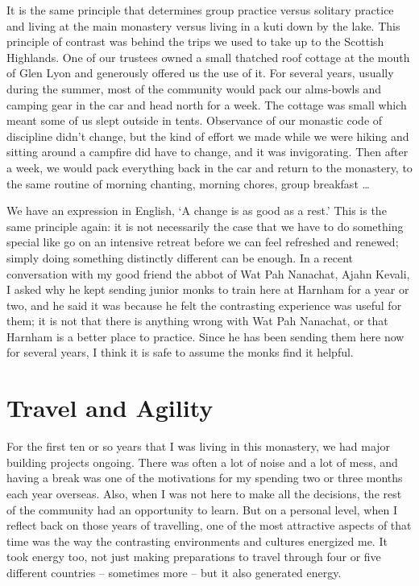 It is the same principle that determines group practice versus solitary
practice and living at the main monastery versus living in a kuti down
by the lake. This principle of contrast was behind the trips we used to
take up to the Scottish Highlands. One of our trustees owned a small
thatched roof cottage at the mouth of Glen Lyon and generously offered
us the use of it. For several years, usually during the summer, most of
the community would pack our alms-bowls and camping gear in the car and
head north for a week. The cottage was small which meant some of us
slept outside in tents. Observance of our monastic code of discipline
didn't change, but the kind of effort we made while we were hiking and
sitting around a campfire did have to change, and it was invigorating.
Then after a week, we would pack everything back in the car and return
to the monastery, to the same routine of morning chanting, morning
chores, group breakfast \ldots{}

We have an expression in English, `A change is as good as a rest.' This
is the same principle again: it is not necessarily the case that we have
to do something special like go on an intensive retreat before we can
feel refreshed and renewed; simply doing something distinctly different
can be enough. In a recent conversation with my good friend the abbot of
Wat Pah Nanachat, Ajahn Kevali, I asked why he kept sending junior monks
to train here at Harnham for a year or two, and he said it was because
he felt the contrasting experience was useful for them; it is not that
there is anything wrong with Wat Pah Nanachat, or that Harnham is a
better place to practice. Since he has been sending them here now for
several years, I think it is safe to assume the monks find it helpful.

\section{Travel and Agility}

For the first ten or so years that I was living in this monastery, we
had major building projects ongoing. There was often a lot of noise and
a lot of mess, and having a break was one of the motivations for my
spending two or three months each year overseas. Also, when I was not
here to make all the decisions, the rest of the community had an
opportunity to learn. But on a personal level, when I reflect back on
those years of travelling, one of the most attractive aspects of that
time was the way the contrasting environments and cultures energized me.
It took energy too, not just making preparations to travel through four
or five different countries -- sometimes more -- but it also generated
energy.

